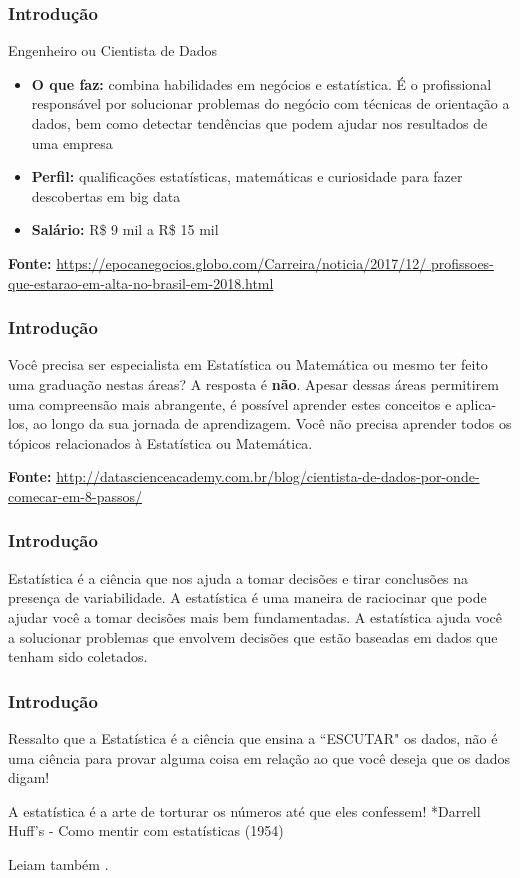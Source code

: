 \documentclass[14pt,aspectratio=1610]{beamer}
\begin{document}
\begin{frame}{}
\frametitle{Introdução}
\begin{block}{Engenheiro ou Cientista de Dados}
\justifying
\begin{itemize}
\item {\bf O que faz:} combina habilidades em negócios e estatística. É o profissional responsável por solucionar problemas do negócio com técnicas de orientação a dados, bem como detectar tendências que podem ajudar nos resultados de uma empresa
\item {\bf Perfil:} qualificações estatísticas, matemáticas e curiosidade para fazer descobertas em big data
\item {\bf Salário:} R\$ 9 mil a R\$ 15 mil\\
\end{itemize}
{\bf Fonte:} \url{https://epocanegocios.globo.com/Carreira/noticia/2017/12/
profissoes-que-estarao-em-alta-no-brasil-em-2018.html}
\end{block}
\end{frame}

\begin{frame}{}
\frametitle{Introdução}
\begin{block}{}
\justifying
Você precisa ser especialista em Estatística ou Matemática ou mesmo ter feito uma graduação nestas áreas? \pause A resposta é {\bf não}. \pause Apesar dessas áreas permitirem uma compreensão mais abrangente, é possível aprender estes conceitos e aplica-los, ao longo da sua jornada de aprendizagem. Você não precisa aprender todos os tópicos relacionados à Estatística ou Matemática.

{\bf Fonte:} \url{http://datascienceacademy.com.br/blog/cientista-de-dados-por-onde-comecar-em-8-passos/}
\end{block}
\end{frame}

\begin{frame}{}
\frametitle{Introdução}
\begin{block}{}
\justifying
Estatística é a ciência que nos ajuda a tomar decisões e tirar conclusões na presença de variabilidade. A estatística é uma maneira de raciocinar que pode ajudar você a tomar decisões mais bem fundamentadas. A estatística ajuda você a solucionar problemas que envolvem decisões que estão baseadas em dados que tenham sido coletados.
\end{block}
\end{frame}

\begin{frame}{}
\frametitle{Introdução}
\begin{block}{}
\justifying
Ressalto que a Estatística é a ciência que ensina a ``ESCUTAR" os dados, não é uma ciência para provar alguma coisa em relação ao que você deseja que os dados digam!
\end{block}
\pause
\begin{block}{}
\justifying
A estatística é a arte de torturar os números até que eles confessem!
*Darrell Huff's - Como mentir com estatísticas (1954)

Leiam também \cite{super16}.
\end{block}
\end{frame}
\end{document}
